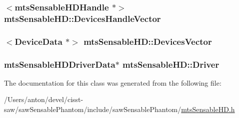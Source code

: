 \subsubsection[{Devices\+Handle\+Vector}]{$<$mts\+Sensable\+H\+D\+Handle $\ast$$>$ mts\+Sensable\+H\+D\+::\+Devices\+Handle\+Vector\hspace{0.3cm}{\ttfamily [protected]}}\label{classmts_sensable_h_d_addc29ab0005b52b7c220957338fd13b0}
\hypertarget{classmts_sensable_h_d_a0c8ea80df145268d76c57d99ca5820e3}{}
\subsubsection[{Devices\+Vector}]{$<${\bf Device\+Data} $\ast$$>$ mts\+Sensable\+H\+D\+::\+Devices\+Vector\hspace{0.3cm}{\ttfamily [protected]}}\label{classmts_sensable_h_d_a0c8ea80df145268d76c57d99ca5820e3}
\hypertarget{classmts_sensable_h_d_abdb150f4135097e1530e967a8b4c9b8c}{}
\subsubsection[{Driver}]{\setlength{\rightskip}{0pt plus 5cm}mts\+Sensable\+H\+D\+Driver\+Data$\ast$ mts\+Sensable\+H\+D\+::\+Driver\hspace{0.3cm}{\ttfamily [protected]}}\label{classmts_sensable_h_d_abdb150f4135097e1530e967a8b4c9b8c}


The documentation for this class was generated from the following file\+:\begin{DoxyCompactItemize}
\item 
/\+Users/anton/devel/cisst-\/saw/saw\+Sensable\+Phantom/include/saw\+Sensable\+Phantom/\hyperlink{mts_sensable_h_d_8h}{mts\+Sensable\+H\+D.\+h}\end{DoxyCompactItemize}
